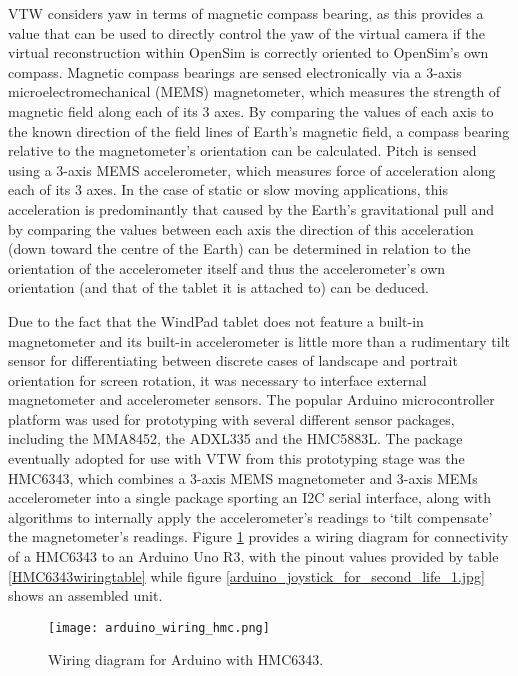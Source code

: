 VTW considers yaw in terms of magnetic compass bearing, as this provides a value that can be used to directly control the yaw of the virtual camera if the virtual reconstruction within OpenSim is correctly oriented to OpenSim's own compass. Magnetic compass bearings are sensed electronically via a 3-axis microelectromechanical (MEMS) magnetometer, which measures the strength of magnetic field along each of its 3 axes. By comparing the values of each axis to the known direction of the field lines of Earth's magnetic field, a compass bearing relative to the magnetometer's orientation can be calculated. Pitch is sensed using a 3-axis MEMS accelerometer, which measures force of acceleration along each of its 3 axes. In the case of static or slow moving applications, this acceleration is predominantly that caused by the Earth's gravitational pull and by comparing the values between each axis the direction of this acceleration (down toward the centre of the Earth) can be determined in relation to the orientation of the accelerometer itself and thus the accelerometer's own orientation (and that of the tablet it is attached to) can be deduced.

Due to the fact that the WindPad tablet does not feature a built-in magnetometer and its built-in accelerometer is little more than a rudimentary tilt sensor for differentiating between discrete cases of landscape and portrait orientation for screen rotation, it was necessary to interface external magnetometer and accelerometer sensors. The popular Arduino\ArduinoFootnote{} microcontroller platform was used for prototyping with several different sensor packages, including the MMA8452\MMAfootnote{}, the ADXL335\ADXLfootnote{} and the HMC5883L\HMCfootnote{}. The package eventually adopted for use with VTW from this prototyping stage was the HMC6343\HMCtwoFootnote{}, which combines a 3-axis MEMS magnetometer and 3-axis MEMs accelerometer into a single package sporting an I2C serial interface, along with algorithms to internally apply the accelerometer's readings to `tilt compensate' the magnetometer's readings. Figure \ref{arduino_wiring_hmc.png} provides a wiring diagram for connectivity of a HMC6343 to an Arduino Uno R3, with the pinout values provided by table \ref{HMC6343wiringtable} while figure \ref{arduino_joystick_for_second_life_1.jpg} shows an assembled unit.

\begin{figure}[h]
\centering
  \texttt{[image: arduino\_wiring\_hmc.png]}
  \caption{Wiring diagram for Arduino with HMC6343.}
  \label{arduino_wiring_hmc.png}
\end{figure}

